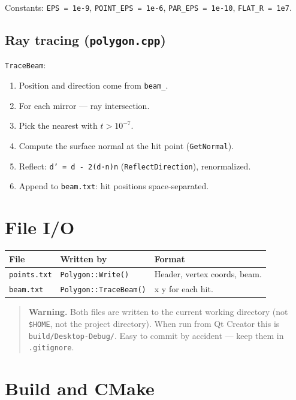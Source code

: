 \documentclass[a4paper,11pt]{article}
\newcommand{\file}[1]{\texttt{#1}}
\newcommand{\code}[1]{\texttt{#1}}
\begin{document}
Constants:
\code{EPS = 1e-9}, \code{POINT\_EPS = 1e-6}, \code{PAR\_EPS = 1e-10},
\code{FLAT\_R = 1e7}.

\subsection{Ray tracing (\file{polygon.cpp})}

\code{TraceBeam}:
\begin{enumerate}[leftmargin=*]
    \item Position and direction come from \code{beam\_}.
    \item For each mirror — ray intersection.
    \item Pick the nearest with $t > 10^{-7}$.
    \item Compute the surface normal at the hit point
          (\code{GetNormal}).
    \item Reflect: \code{d' = d - 2(d·n)n} (\code{ReflectDirection}),
          renormalized.
    \item Append to \file{beam.txt}: hit positions space-separated.
\end{enumerate}

\section{File I/O}

\begin{longtable}{@{}p{4cm}p{4.5cm}p{6cm}@{}}
\toprule
\textbf{File} & \textbf{Written by} & \textbf{Format} \\ \midrule
\endhead
\file{points.txt} & \code{Polygon::Write()} & Header, vertex coords, beam. \\
\file{beam.txt} & \code{Polygon::TraceBeam()} & x y for each hit. \\
\bottomrule
\end{longtable}

\begin{quote}
\textbf{Warning.} Both files are written to the current working
directory (not \code{\$HOME}, not the project directory). When run from
Qt Creator this is \code{build/Desktop-Debug/}. Easy to commit by
accident — keep them in \code{.gitignore}.
\end{quote}

\section{Build and CMake}
\end{document}
